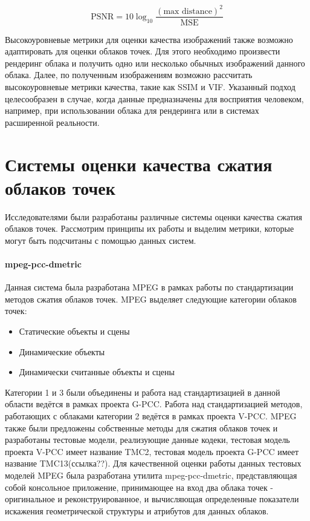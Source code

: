 \begin{equation} \label{eq:cloud_psnr}
    \text{PSNR} = 10\log_{10} \frac{\left(\text{max distance}\right)^{2}}{\text{MSE}}
\end{equation}


Высокоуровневые метрики для оценки качества изображений также возможно
адаптировать для оценки облаков точек. Для этого необходимо произвести рендеринг
облака и получить одно или несколько обычных изображений данного облака. Далее,
по полученным изображениям возможно рассчитать высокоуровневые метрики качества,
такие как SSIM и VIF. Указанный подход целесообразен в случае, когда данные
предназначены для восприятия человеком, например, при использовании облака для
рендеринга или в системах расширенной реальности.

\section{Системы оценки качества сжатия облаков точек}

Исследователями были разработаны различные системы оценки качества сжатия
облаков точек. Рассмотрим принципы их работы и выделим метрики, которые могут
быть подсчитаны с помощью данных систем.

\paragraph{mpeg-pcc-dmetric}

Данная система была разработана MPEG в рамках работы по стандартизации методов
сжатия облаков точек. MPEG выделяет следующие категории облаков
точек\cite{CallForProposalV2}:

\begin{itemize}
    \item Статические объекты и сцены
    \item Динамические объекты
    \item Динамически считанные объекты и сцены
\end{itemize}


Категории 1 и 3 были объединены и работа над стандартизацией в данной области
ведётся в рамках проекта G-PCC. Работа над стандартизацией методов, работающих с
облаками категории 2 ведётся в рамках проекта V-PCC. MPEG также были предложены
собственные методы для сжатия облаков точек и разработаны тестовые модели,
реализующие данные кодеки, тестовая модель проекта V-PCC имеет название TMC2,
тестовая модель проекта G-PCC имеет название TMC13(ссылка??). Для качественной
оценки работы данных тестовых моделей MPEG была разработана утилита
mpeg-pcc-dmetric, представляющая собой консольное приложение, принимающее на
вход два облака точек - оригинальное и реконструированное, и вычисляющая
определенные показатели искажения геометрической структуры и атрибутов для
данных облаков.

